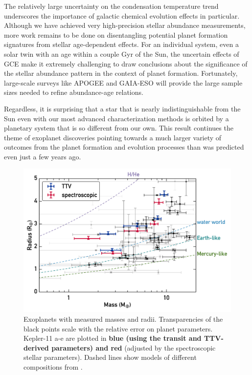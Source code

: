 \documentclass[twocolumn]{aastex61}
\begin{document}
The relatively large uncertainty on the condensation temperature trend underscores the importance of galactic chemical evolution effects in particular. Although we have achieved very high-precision stellar abundance measurements, more work remains to be done on disentangling potential planet formation signatures from stellar age-dependent effects. For an individual system, even a solar twin with an age within a couple Gyr of the Sun, the uncertain effects of GCE make it extremely challenging to draw conclusions about the significance of the stellar abundance pattern in the context of planet formation. Fortunately, large-scale surveys like APOGEE and GAIA-ESO will provide the large sample sizes needed to refine abundance-age relations.

Regardless, it is surprising that a star that is nearly indistinguishable from the Sun even with our most advanced characterization methods is orbited by a planetary system that is so different from our own. This result continues the theme of exoplanet discoveries pointing towards a much larger variety of outcomes from the planet formation and evolution processes than was predicted even just a few years ago.

\begin{figure}
\centering
\includegraphics[scale=0.6]{K11_massradius}
\caption{Exoplanets with measured masses and radii. Transparencies of the black points scale with the relative error on planet parameters. Kepler-11 a-e are plotted in \textbf{blue (using the transit and TTV-derived parameters) and red }(adjusted by the spectroscopic stellar parameters). Dashed lines show models of different compositions from \citet{Seager2007}.}
\label{fig:mr}
\end{figure}
\end{document}
